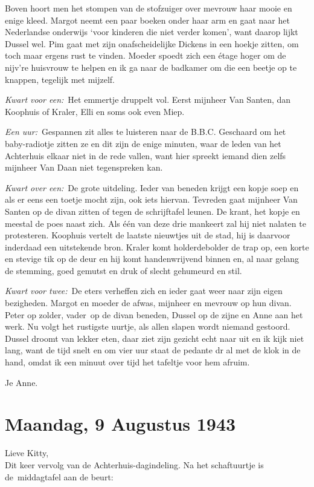 \documentclass{book}
\begin{document}
Boven hoort men het stompen van de stofzuiger over mevrouw haar mooie en
enige kleed. Margot neemt een paar boeken onder haar arm en gaat naar
het Nederlandse onderwijs `voor kinderen die niet verder komen', want
daarop lijkt Dussel wel. Pim gaat met zijn onafscheidelijke Dickens in
een hoekje zitten, om toch maar ergens rust te vinden. Moeder spoedt
zich een étage hoger om de nijv're huisvrouw te helpen en ik ga naar de
badkamer om die een beetje op te knappen, tegelijk met mijzelf.

\emph{Kwart voor een:}~Het emmertje druppelt vol. Eerst mijnheer Van
Santen, dan Koophuis of Kraler, Elli en soms ook even Miep.

\emph{Een uur:}~Gespannen zit alles te luisteren naar de B.B.C.
Geschaard om het baby-radiotje zitten ze en dit zijn de enige minuten,
waar de leden van het Achterhuis elkaar niet in de rede vallen, want
hier spreekt iemand dien zelfs mijnheer Van Daan niet tegenspreken kan.

\emph{Kwart over een:}~De grote uitdeling. Ieder van beneden krijgt een
kopje soep en als er eens een toetje mocht zijn, ook iets hiervan.
Tevreden gaat mijnheer Van Santen op de divan zitten of tegen de
schrijftafel leunen. De krant, het kopje en meestal de poes naast zich.
Als één van deze drie mankeert zal hij niet nalaten te protesteren.
Koophuis vertelt de laatste nieuwtjes uit de stad, hij is daarvoor
inderdaad een uitstekende bron. Kraler komt holderdebolder de trap op,
een korte en stevige tik op de deur en hij komt handenwrijvend binnen
en, al naar gelang de stemming, goed gemutst en druk of slecht gehumeurd
en stil.

\emph{Kwart voor twee:}~De eters verheffen zich en ieder gaat weer naar
zijn eigen bezigheden. Margot en moeder de afwas, mijnheer en mevrouw op
hun divan. Peter op zolder, vader~op de divan beneden, Dussel op de
zijne en Anne aan het werk. Nu volgt het rustigste uurtje, als allen
slapen wordt niemand gestoord. Dussel droomt van lekker eten, daar ziet
zijn gezicht echt naar uit en ik kijk niet lang, want de tijd snelt en
om vier uur staat de pedante dr al met de klok in de hand, omdat ik een
minuut over tijd het tafeltje voor hem afruim.

Je Anne.

\chapter{Maandag, 9 Augustus 1943}

Lieve Kitty,\\Dit keer vervolg van de Achterhuis-dagindeling. Na het
schaftuurtje is de~middagtafel aan de beurt:
\end{document}
